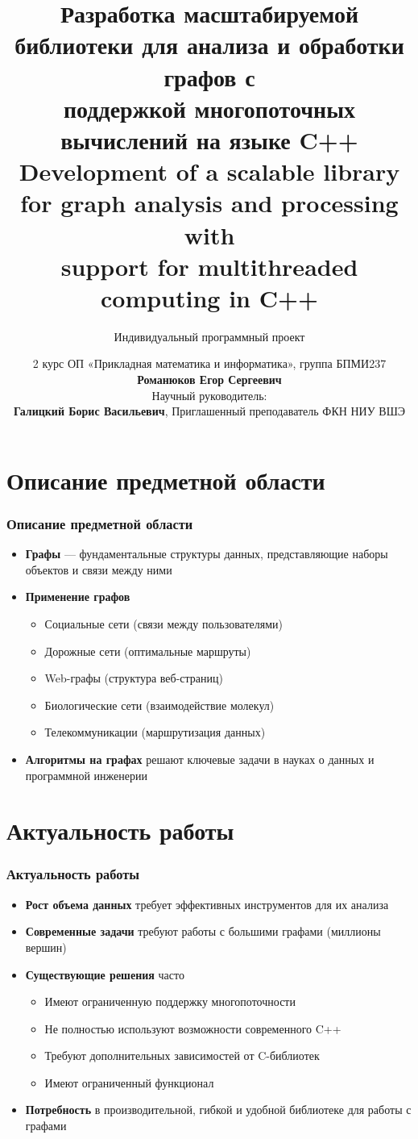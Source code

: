 \documentclass[aspectratio=169]{beamer}
\title[Библиотека на C++]{%
  \fontsize{12}{14}\selectfont Разработка масштабируемой библиотеки для анализа и обработки графов с\\
  \fontsize{12}{14}\selectfont поддержкой многопоточных вычислений на языке C++\\[0.3cm]
  \fontsize{10}{12}\selectfont Development of a scalable library for graph analysis and processing with\\
  \fontsize{10}{12}\selectfont support for multithreaded computing in C++
}
\subtitle{\fontsize{9}{11}\selectfont Индивидуальный программный проект}
\author[Романюков Е.С.]{%
  2 курс ОП «Прикладная математика и информатика», группа БПМИ237\\
  \textbf{Романюков Егор Сергеевич}\\[0.3cm]
  Научный руководитель:\\
  \textbf{Галицкий Борис Васильевич}, Приглашенный преподаватель ФКН НИУ ВШЭ
}
\institute[НИУ ВШЭ]{%
  Национальный исследовательский университет\\
  «Высшая школа экономики»
}
\date{}
\begin{document}
\frame[plain]{\titlepage}


\section{Описание предметной области}
\begin{frame}
  \frametitle{Описание предметной области}
  \begin{itemize}
    \item \textbf{Графы} — фундаментальные структуры данных, представляющие наборы объектов и связи между ними
    \item \textbf{Применение графов}
      \begin{itemize}
        \item Социальные сети (связи между пользователями)
        \item Дорожные сети (оптимальные маршруты)
        \item Web-графы (структура веб-страниц)
        \item Биологические сети (взаимодействие молекул)
        \item Телекоммуникации (маршрутизация данных)
      \end{itemize}
    \item \textbf{Алгоритмы на графах} решают ключевые задачи в науках о данных и программной инженерии
  \end{itemize}
\end{frame}

\section{Актуальность работы}
\begin{frame}
  \frametitle{Актуальность работы}
  \begin{itemize}
    \item \textbf{Рост объема данных} требует эффективных инструментов для их анализа
    \item \textbf{Современные задачи} требуют работы с большими графами (миллионы вершин)
    \item \textbf{Существующие решения} часто
      \begin{itemize}
        \item Имеют ограниченную поддержку многопоточности
        \item Не полностью используют возможности современного C++
        \item Требуют дополнительных зависимостей от C-библиотек
        \item Имеют ограниченный функционал
      \end{itemize}
    \item \textbf{Потребность} в производительной, гибкой и удобной библиотеке для работы с графами
  \end{itemize}
\end{frame}
\end{document}
